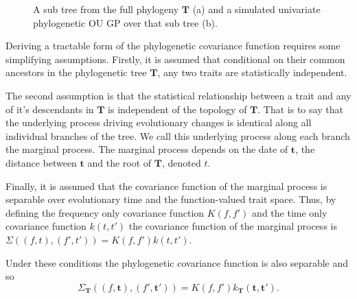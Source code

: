 \documentclass{ws-rv9x6}
\begin{document}
\begin{figure}[h]
	\caption{A sub tree from the full phylogeny \(\mathbf{T}\) (a) and a simulated univariate phylogenetic OU GP over that sub tree (b).}
	\label{fig:subtree}
\end{figure}

Deriving a tractable form of the phylogenetic covariance function requires some simplifying assumptions. Firstly, it is assumed that conditional on their common ancestors in the phylogenetic tree \(\mathbf{T}\), any two traits are statistically independent. 

The second assumption is that the statistical relationship between a trait and any of it's descendants in \(\mathbf{T}\) is independent of the topology of \(\mathbf{T}\). That is to say that the underlying process driving evolutionary changes is identical along all individual branches of the tree. We call this underlying process along each branch the marginal process. The marginal process depends on the date of \(\mathbf{t}\), the distance between \(\mathbf{t}\) and the root of \(\mathbf{T}\), denoted \(t\). 

Finally, it is assumed that the covariance function of the marginal process is separable over evolutionary time and the function-valued trait space. Thus, by defining the frequency only covariance function \(K(f,f')\) and the time only covariance function \(k(t,t')\) the covariance function of the marginal process is \(\Sigma\left((f,t), (f',t')\right) = K(f, f') k(t,t')\).

Under these conditions the phylogenetic covariance function is also separable and so
\begin{equation}
\Sigma_{\mathbf{T}}\left((f,\mathbf{t}), (f',\mathbf{t}')\right) = K(f, f') k_{\mathbf{T}}(\mathbf{t},\mathbf{t}').
\label{eqn:phy}
\end{equation}
\end{document}
